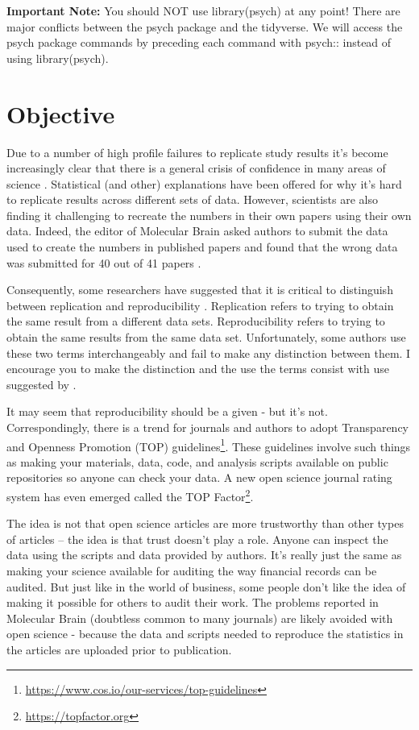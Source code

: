 \documentclass[
]{krantz}
\renewcommand{\href}[2]{#2\footnote{\url{#1}}}
\begin{document}
\textbf{Important Note:} You should NOT use library(psych) at any point! There are major conflicts between the psych package and the tidyverse. We will access the psych package commands by preceding each command with psych:: instead of using library(psych).

\hypertarget{objective-2}{%
\section{Objective}\label{objective-2}}

Due to a number of high profile failures to replicate study results \citep{cos2015} it's become increasingly clear that there is a general crisis of confidence in many areas of science \citep{baker2016}. Statistical (and other) explanations have been offered \citep{simmons2011} for why it's hard to replicate results across different sets of data. However, scientists are also finding it challenging to recreate the numbers in their own papers using their own data. Indeed, the editor of Molecular Brain asked authors to submit the data used to create the numbers in published papers and found that the wrong data was submitted for 40 out of 41 papers \citep{miyakawa2020}.

Consequently, some researchers have suggested that it is critical to distinguish between replication and reproducibility \citep{patil2019}. Replication refers to trying to obtain the same result from a different data sets. Reproducibility refers to trying to obtain the same results from the same data set. Unfortunately, some authors use these two terms interchangeably and fail to make any distinction between them. I encourage you to make the distinction and the use the terms consist with use suggested by \citep{patil2019}.

It may seem that reproducibility should be a given - but it's not. Correspondingly, there is a trend for journals and authors to adopt Transparency and Openness Promotion (TOP) \href{https://www.cos.io/our-services/top-guidelines}{guidelines}. These guidelines involve such things as making your materials, data, code, and analysis scripts available on public repositories so anyone can check your data. A new open science journal rating system has even emerged called the \href{https://topfactor.org}{TOP Factor}.

The idea is not that open science articles are more trustworthy than other types of articles -- the idea is that trust doesn't play a role. Anyone can inspect the data using the scripts and data provided by authors. It's really just the same as making your science available for auditing the way financial records can be audited. But just like in the world of business, some people don't like the idea of making it possible for others to audit their work. The problems reported in Molecular Brain (doubtless common to many journals) are likely avoided with open science - because the data and scripts needed to reproduce the statistics in the articles are uploaded prior to publication.
\end{document}
